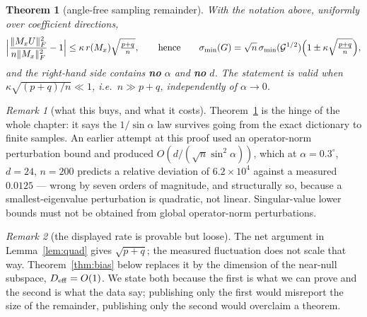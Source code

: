 \documentclass[11pt]{article}
\newtheorem{theorem}{Theorem}[section]
\theoremstyle{remark}
\newtheorem{remark}{Remark}[section]
\newcommand{\Gr}{\mathcal{G}}
\newcommand{\minr}[1]{\sigma_{\min}(#1)}
\begin{document}
\begin{theorem}[angle-free sampling remainder]\label{thm:sampling}
With the notation above, uniformly over coefficient directions,
\begin{equation}\label{eq:anglefree}
  \Bigl|\frac{\|M_xU\|_F^2}{n\|M_x\|_F^2}-1\Bigr|
  \le \kappa\, r(M_x)\sqrt{\tfrac{p+q}{n}},
  \qquad\text{hence}\qquad
  \minr G=\sqrt n\,\minr{\Gr^{1/2}}\Bigl(1\pm\kappa\sqrt{\tfrac{p+q}{n}}\Bigr),
\end{equation}
and the right-hand side contains \textbf{no} $\alpha$ and \textbf{no} $d$. The
statement is valid when $\kappa\sqrt{(p+q)/n}\ll1$, i.e.\ $n\gg p+q$, independently of
$\alpha\to0$.
\end{theorem}

\begin{remark}[what this buys, and what it costs]
Theorem~\ref{thm:sampling} is the hinge of the whole chapter: it says the $1/\sin\alpha$
law survives going from the exact dictionary to finite samples. An earlier attempt at
this proof used an operator-norm perturbation bound and produced $O(d/(\sqrt n\sin^2\alpha))$,
which at $\alpha=0.3^\circ$, $d=24$, $n=200$ predicts a relative deviation of $6.2\!\times\!10^{4}$
against a measured $0.0125$ --- wrong by seven orders of magnitude, and structurally
so, because a smallest-eigenvalue perturbation is quadratic, not linear. Singular-value
lower bounds must not be obtained from global operator-norm perturbations.
\end{remark}

\begin{remark}[the displayed rate is provable but loose]\label{rem:loose}
The net argument in Lemma~\ref{lem:quad} gives $\sqrt{p+q}$; the measured fluctuation does not
scale that way. Theorem~\ref{thm:bias} below replaces it by the dimension of the
near-null subspace, $D_{\rm eff}=O(1)$. We state both because the first is what we can
prove and the second is what the data say; publishing only the first would misreport the
size of the remainder, publishing only the second would overclaim a theorem.
\end{remark}
\end{document}
